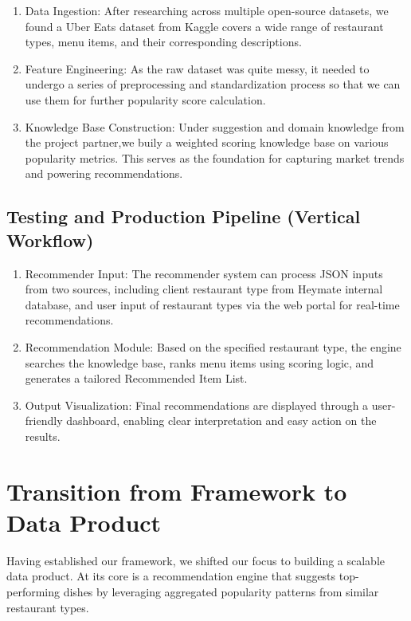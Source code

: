 \documentclass[
  11pt,
  a4paper,
  DIV=11,
  numbers=noendperiod]{scrartcl}
\providecommand{\tightlist}{%
  \setlength{\itemsep}{0pt}\setlength{\parskip}{0pt}}\usepackage{longtable,booktabs,array}
\begin{document}
\begin{enumerate}
\def\labelenumi{\arabic{enumi}.}
\tightlist
\item
  Data Ingestion: After researching across multiple open-source
  datasets, we found a Uber Eats dataset from Kaggle covers a wide range
  of restaurant types, menu items, and their corresponding descriptions.
\item
  Feature Engineering: As the raw dataset was quite messy, it needed to
  undergo a series of preprocessing and standardization process so that
  we can use them for further popularity score calculation.
\item
  Knowledge Base Construction: Under suggestion and domain knowledge
  from the project partner,we buily a weighted scoring knowledge base on
  various popularity metrics. This serves as the foundation for
  capturing market trends and powering recommendations.
\end{enumerate}

\subsection{Testing and Production Pipeline (Vertical
Workflow)}\label{testing-and-production-pipeline-vertical-workflow}

\begin{enumerate}
\def\labelenumi{\arabic{enumi}.}
\tightlist
\item
  Recommender Input: The recommender system can process JSON inputs from
  two sources, including client restaurant type from Heymate internal
  database, and user input of restaurant types via the web portal for
  real-time recommendations.
\item
  Recommendation Module: Based on the specified restaurant type, the
  engine searches the knowledge base, ranks menu items using scoring
  logic, and generates a tailored Recommended Item List.
\item
  Output Visualization: Final recommendations are displayed through a
  user-friendly dashboard, enabling clear interpretation and easy action
  on the results.
\end{enumerate}

\section{Transition from Framework to Data
Product}\label{transition-from-framework-to-data-product}

Having established our framework, we shifted our focus to building a
scalable data product. At its core is a recommendation engine that
suggests top-performing dishes by leveraging aggregated popularity
patterns from similar restaurant types.
\end{document}
